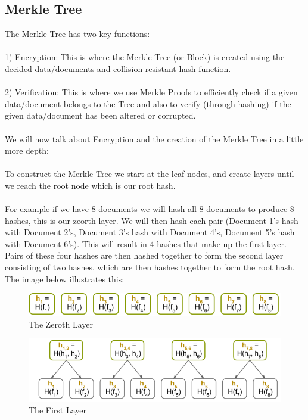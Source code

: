 \documentclass{article}
\begin{document}
\subsection{Merkle Tree}
The Merkle Tree has two key functions: 
\\\\
1) Encryption: This is where the Merkle Tree (or Block) is created using the decided data/documents and collision resistant hash function.
\\\\
2) Verification: This is where we use Merkle Proofs to efficiently check if a given data/document belongs to the Tree and also to verify (through hashing) if the given data/document has been altered or corrupted.
\\\\
We will now talk about Encryption and the creation of the Merkle Tree in a little more depth:
\\\\
To construct the Merkle Tree we start at the leaf nodes, and create layers until we reach the root node which is our root hash. 
\\\\
For example if we have 8 documents we will hash all 8 documents to produce 8 hashes, this is our zeorth layer. We will then hash each pair (Document 1's hash with Document 2's, Document 3's hash with Document 4's, Document 5's hash with Document 6's). This will result in 4 hashes that make up the first layer. Pairs of these four hashes are then hashed together to form the second layer consisting of two hashes, which are then hashes together to form the root hash. The image below illustrates this:

\begin{figure}[htp]
    \centering
    \includegraphics[width=12cm]{Layer 0}
    \caption{The Zeroth Layer}
    \label{fig:f1}
\end{figure}

\begin{figure}[htp]
    \centering
    \includegraphics[width=12cm]{Layer 1}
    \caption{The First Layer}
    \label{fig:f2}
\end{figure}
\end{document}

